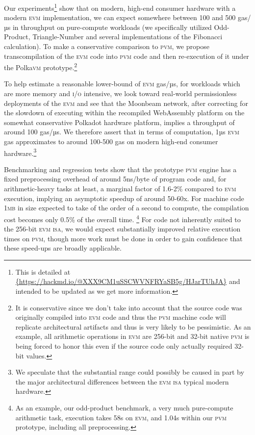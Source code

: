 Our experiments\footnote{This is detailed at \url{{https://hackmd.io/@XXX9CM1uSSCWVNFRYaSB5g/HJarTUhJA}} and intended to be updated as we get more information.} show that on modern, high-end consumer hardware with a modern \textsc{evm} implementation, we can expect somewhere between 100 and 500 gas/µs in throughput on pure-compute workloads (we specifically utilized Odd-Product, Triangle-Number and several implementations of the Fibonacci calculation). To make a conservative comparison to \textsc{pvm}, we propose transcompilation of the \textsc{evm} code into \textsc{pvm} code and then re-execution of it under the Polka\textsc{vm} prototype.\footnote{It is conservative since we don't take into account that the source code was originally compiled into \textsc{evm} code and thus the \textsc{pvm} machine code will replicate architectural artifacts and thus is very likely to be pessimistic. As an example, all arithmetic operations in \textsc{evm} are 256-bit and 32-bit native \textsc{pvm} is being forced to honor this even if the source code only actually required 32-bit values.}

To help estimate a reasonable lower-bound of \textsc{evm} gas/µs, \eg for workloads which are more memory and \textsc{i/o} intensive, we look toward real-world permissionless deployments of the \textsc{evm} and see that the Moonbeam network, after correcting for the slowdown of executing within the recompiled WebAssembly platform on the somewhat conservative Polkadot hardware platform, implies a throughput of around 100 gas/µs. We therefore assert that in terms of computation, 1µs \textsc{evm} gas approximates to around 100-500 gas on modern high-end consumer hardware.\footnote{We speculate that the substantial range could possibly be caused in part by the major architectural differences between the \textsc{evm} \textsc{isa} typical modern hardware.}

Benchmarking and regression tests show that the prototype \textsc{pvm} engine has a fixed preprocessing overhead of around 5ns/byte of program code and, for arithmetic-heavy tasks at least, a marginal factor of 1.6-2\% compared to \textsc{evm} execution, implying an asymptotic speedup of around 50-60x. For machine code 1\textsc{mb} in size expected to take of the order of a second to compute, the compilation cost becomes only 0.5\% of the overall time. \footnote{As an example, our odd-product benchmark, a very much pure-compute arithmetic task, execution takes 58s on \textsc{evm}, and 1.04s within our \textsc{pvm} prototype, including all preprocessing.} For code not inherently suited to the 256-bit \textsc{evm} \textsc{isa}, we would expect substantially improved relative execution times on \textsc{pvm}, though more work must be done in order to gain confidence that these speed-ups are broadly applicable.

